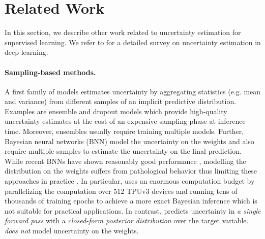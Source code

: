 \section{Related Work}
\label{sec:related_work_007}

In this section, we describe other work related to uncertainty estimation for supervised learning. We refer to \cite{uncertainty-survey} for a detailed survey on uncertainty estimation in deep learning. 

\paragraph{Sampling-based methods.} A first family of models estimates uncertainty by aggregating statistics (e.g. mean and variance) from different samples of an implicit predictive distribution. Examples are ensemble \citep{bayesian-classifier-combination,ensembles, dynamic-bayesian-combination-classifiers,batch-ensembles,hyper-ensembles} and dropout \citep{dropout} models which provide high-quality uncertainty estimates \citep{dataset-shift} at the cost of an
expensive sampling phase at inference time. Moreover, ensembles usually require training multiple models. Further, Bayesian neural networks (BNN) \citep{bayesian-networks, scalable-laplace-bnn, simple-baseline-uncertainty} model the uncertainty on the weights and also require multiple samples to estimate the uncertainty on the final prediction. While recent BNNs have shown reasonably good performance \citep{rank-1-bnn,practical-bayesian,liberty-depth-bnn}, modelling the distribution on the weights suffers from pathological behavior thus limiting these approaches in practice \citep{expressiveness-bnn, practical-bnn, what-bnn-posterior}. In particular, \cite{what-bnn-posterior} uses an enormous computation budget by parallelizing the computation over 512 TPUv3  devices and running tens of thousands of training epochs to achieve a more exact Bayesian inference which is not suitable for practical applications. In contrast, \NatPNacro{} predicts uncertainty in \emph{a single forward pass} with a \emph{closed-form posterior distribution} over the target variable. \NatPNacro{} \emph{does not} model uncertainty on the weights.

